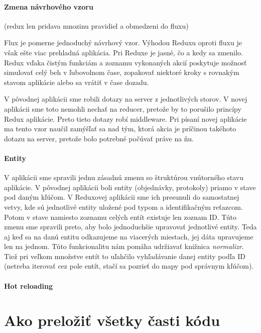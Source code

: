 \paragraph{Zmena návrhového vzoru}
\TODO{} (redux len pridava mnozinu pravidiel a obmedzeni do fluxu) \TODO{}

Flux je pomerne jednoduchý návrhový vzor. Výhodou Reduxu oproti fluxu je však ešte viac prehladná aplikácia. Pri Reduxe je jasné, čo a kedy sa zmenilo. Redux vďaka čistým funkciám a zoznamu vykonaných akcií poskytuje možnosť simulovať celý beh v ľubovolnom čase, zopakovať niektoré kroky s rovnakým stavom aplikácie alebo sa vrátiť v čase dozadu.

V pôvodnej aplikácii sme robili dotazy na server z jednotlivých storov. V novej aplikácii sme toto nemohli nechať na reducer, pretože by to porušilo princípy Redux aplikácie. Preto tieto dotazy robí middleware. Pri písaní novej aplikácie ma tento vzor naučil zamýšľať sa nad tým, ktorá akcia je príčinou takéhoto dotazu na server, pretože bolo potrebné počúvať práve na ňu.

%

\paragraph{Entity}%
V aplikácii sme spravili jednu zásadnú zmenu so štruktúrou vnútorného stavu aplikácie. V pôvodnej aplikácii boli entity (objednávky, protokoly) priamo v stave pod daným kľúčom. 
V Reduxovej aplikácii sme ich presunuli do samostatnej vetvy, kde sú jednotlivé entity uložené pod typom a identifikačným reťazcom. Potom v stave namiesto zoznamu celých entít existuje len zoznam ID. 
Túto zmenu sme spravili preto, aby bolo jednoduchšie upravovať jednotlivé entity. Teda aj keď sa na danú entitu odkazujeme na viacerých miestach, jej dáta upravujeme len na jednom. Túto funkcionalitu nám pomáha udržiavať knižnica \emph{normalizr}.
Tiež pri veľkom množstve entít to uľahčilo vyhľadávanie danej entity podľa ID (netreba iterovať cez pole entít, stačí sa pozrieť do mapy pod správnym kľúčom).

\paragraph{Hot reloading}
\TODO{}

\section{Ako preložiť všetky časti kódu}

